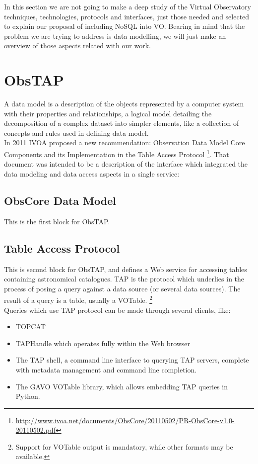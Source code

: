 In this section we are not going to make a deep study of the Virtual Observatory techniques, technologies, protocols and interfaces, just those needed and selected to explain our proposal of including NoSQL into VO. Bearing in mind that the problem we are trying to address is data modelling, we will just make an overview of those aspects related with our work.\\

\section{ObsTAP}

A data model is a description of the objects represented by a computer system with their properties and relationships, a logical model detailing the decomposition of a complex dataset into simpler elements, like a collection of concepts and rules used in defining data model.\\

In 2011 IVOA proposed a new recommendation: Observation Data Model Core Components and its Implementation in the Table Access Protocol \footnote{\url{http://www.ivoa.net/documents/ObsCore/20110502/PR-ObsCore-v1.0-20110502.pdf}}. That document was intended to be a description of the interface which integrated the data modeling and data access aspects in a single service:\\ 


\subsection{ObsCore Data Model}

This is the first block for ObsTAP.

\subsection{Table Access Protocol}

This is second block for ObsTAP, and defines a Web service for accessing tables containing astronomical catalogues. TAP is the protocol which underlies in the process of posing a query against a data source (or several data sources). The result of a query is a table, usually a VOTable. \footnote{Support for VOTable output is mandatory, while other formats may be available.}\\ 

Queries which use TAP protocol can be made through several clients, like:
\begin{itemize}
\item TOPCAT
\item TAPHandle which operates fully within the Web browser
\item The TAP shell, a command line interface to querying TAP servers, complete with metadata management and command line completion.
\item The GAVO VOTable library, which allows embedding TAP queries in Python.
\end{itemize}


